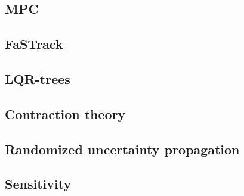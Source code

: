 \subsection{MPC}

\subsection{FaSTrack}

\subsection{LQR-trees}

\subsection{Contraction theory}

\subsection{Randomized uncertainty propagation}

\subsection{Sensitivity}